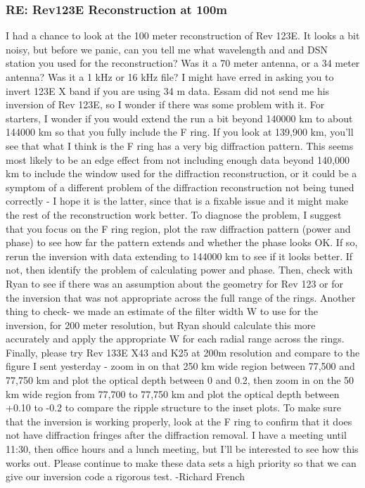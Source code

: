 \documentclass[crop=false,class=book]{standalone}
\begin{document}
\subsubsection{\footnotesize RE: Rev123E Reconstruction at 100m}
I had a chance to look at the 100 meter reconstruction of Rev 123E. It looks a bit noisy, but before we panic, can you tell me what wavelength and and DSN station you used for the reconstruction? Was it a 70 meter antenna, or a 34 meter antenna? Was it a 1 kHz or 16 kHz file? I might have erred in asking you to invert 123E X band if you are using  34 m data. Essam did not send me his inversion of Rev 123E, so I wonder if there was some problem with it. For starters, I wonder if you would extend the run a bit beyond 140000 km to about 144000 km so that you fully include the F ring. If you look at 139,900 km, you'll see that what I think is the F ring has a very big diffraction pattern. This seems most likely to be an edge effect from not including enough data beyond 140,000 km to include the window used for the diffraction reconstruction, or it could be a symptom of a different problem of the diffraction reconstruction not being tuned correctly - I hope it is the latter, since that is a fixable issue and it might make the rest of the reconstruction work better. To diagnose the problem, I suggest that you focus on the F ring region, plot the raw diffraction pattern (power and phase) to see how far the pattern extends and whether the phase looks OK. If so, rerun the inversion with data extending to 144000 km to see if it looks better. If not, then identify the problem of calculating power and phase. Then, check with Ryan to see if there was an assumption about the geometry for Rev 123 or for the inversion that was not appropriate across the full range of the rings. Another thing to check- we made an estimate of the filter width W to use for the inversion, for 200 meter resolution, but Ryan should calculate this more accurately and apply the appropriate W for each radial range across the rings. Finally, please try Rev 133E X43 and K25 at 200m resolution and compare to the figure I sent yesterday - zoom in on that 250 km wide region between 77,500 and 77,750 km and plot the optical depth between 0 and 0.2, then zoom in on the 50 km wide region from 77,700 to 77,750 km and plot the optical depth between +0.10 to -0.2 to compare the ripple structure to the inset plots. To make sure that the inversion is working properly, look at the F ring to confirm that it does not have diffraction fringes after the diffraction removal. I have a meeting until 11:30, then office hours and a lunch meeting, but I'll be interested to see how this works out. Please continue to make these data sets a high priority so that we can give our inversion code a rigorous test. -Richard French\par
\end{document}
